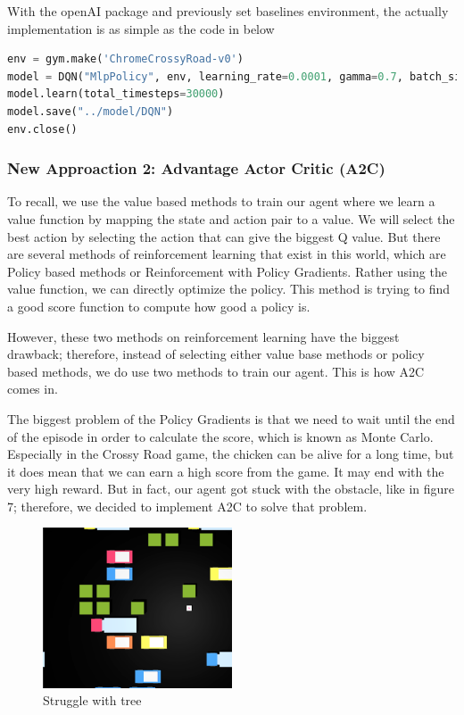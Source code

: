 \documentclass{article}
\begin{document}
With the openAI package and previously set baselines environment, the actually implementation is as simple as the code in below
\begin{lstlisting}[language = Python]
env = gym.make('ChromeCrossyRoad-v0')
model = DQN("MlpPolicy", env, learning_rate=0.0001, gamma=0.7, batch_size=1024, prioritized_replay=True, verbose=1, tensorboard_log="./log/dqn_crossy_road_tensorboard/")
model.learn(total_timesteps=30000)
model.save("../model/DQN")
env.close()
\end{lstlisting}

\subsubsection{New Approaction 2: Advantage Actor Critic (A2C)}

To recall, we use the value based methods to train our agent where we learn a value function by mapping the state and action pair to a value. We will select the best action by selecting the action that can give the biggest Q value. But there are several methods of reinforcement learning that exist in this world, which are Policy based methods or  Reinforcement with Policy Gradients. Rather using the value function, we can directly optimize the policy. This method is trying to find a good score function to compute how good a policy is. \par 

However, these two methods on reinforcement learning have the biggest drawback; therefore, instead of selecting either value base methods or policy based methods, we do use two methods to train our agent. This is how A2C comes in. \par 

The biggest problem of the Policy Gradients is that we need to wait until the end of the episode in order to calculate the score, which is known as Monte Carlo. Especially in the Crossy Road game, the chicken can be alive for a long time, but it does mean that we can earn a high score from the game.
It may end with the very high reward. But in fact, our agent got stuck with the obstacle, like in figure 7; therefore, we decided to implement A2C to solve that problem. \par

\begin{figure}[h]
    \caption{Struggle with tree}
    \centering
    \includegraphics[width=0.5\textwidth]{obstacles_trapped.png}
\end{figure}
\end{document}
